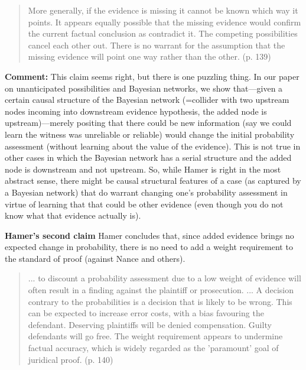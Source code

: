 \documentclass[
  10pt,
  dvipsnames,enabledeprecatedfontcommands]{scrartcl}
\begin{document}
\begin{quote}
More generally, if the evidence is missing it cannot be known which way it points.
It appears equally possible that the missing evidence would confirm the current factual conclusion as
contradict it. The competing possibilities cancel each other out. There is no warrant for the assumption
that the missing evidence will point one way rather than the other. (p. 139)
\end{quote}

\textbf{Comment:} This claim seems right, but there is one puzzling
thing. In our paper on unanticipated possibilities and Bayesian
networks, we show that---given a certain causal structure of the
Bayesian network (=collider with two upstream nodes incoming into
downstream evidence hypothesis, the added node is upstream)---merely
positing that there could be new information (say we could learn the
witness was unreliable or reliable) would change the initial probability
assessment (without learning about the value of the evidence). This is
not true in other cases in which the Bayesian network has a serial
structure and the added node is downstream and not upstream. So, while
Hamer is right in the most abstract sense, there might be causal
structural features of a case (as captured by a Bayesian network) that
do warrant changing one's probability assessment in virtue of learning
that that could be other evidence (even though you do not know what that
evidence actually is).


\textbf{Hamer's second claim} Hamer concludes that, since added evidence
brings no expected change in probability, there is no need to add a
weight requirement to the standard of proof (against Nance and others).

\begin{quote}
... to discount a probability assessment due to a low weight of evidence will often
result in a finding against the plaintiff or prosecution. ... A decision contrary to the probabilities is a decision that is likely to be wrong. This can be expected to increase error costs, with a bias favouring the defendant. Deserving plaintiffs will be denied compensation. Guilty defendants will go free. The weight requirement appears to undermine factual accuracy, which is widely regarded as the 'paramount' goal of
juridical proof. (p. 140)
\end{quote}
\end{document}
